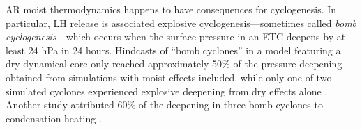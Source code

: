\documentclass[letterpaper,12pt]{article}
\begin{document}



AR moist thermodynamics happens to have consequences for cyclogenesis. In particular, LH release is associated explosive cyclogenesis---sometimes called \textit{bomb cyclogenesis}---which occurs when the surface pressure in an ETC deepens by at least 24 hPa in 24 hours. Hindcasts of ``bomb cyclones'' in a model featuring a dry dynamical core only reached approximately 50\% of the pressure deepening obtained from simulations with moist effects included, while only one of two simulated cyclones experienced explosive deepening from dry effects alone \cite{Reed1988TheForecasts}. Another study attributed 60\% of the deepening in three bomb cyclones to condensation heating \cite{Fink2012DiagnosingAtlantic}. 
\end{document}
